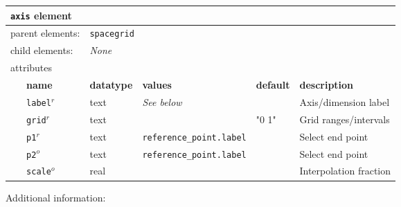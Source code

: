 \FloatBarrier
\begin{table}[h]
\begin{center}
\begin{tabularx}{\textwidth}{l l l l l l }
\hline
\multicolumn{6}{l}{\texttt{axis} element} \\
\hline
\multicolumn{2}{l}{parent elements:} & \multicolumn{4}{l}{\texttt{spacegrid}}\\
\multicolumn{2}{l}{child  elements:} & \multicolumn{4}{l}{\textit{None}}\\
\multicolumn{2}{l}{attributes}  & \multicolumn{4}{l}{}\\
   &   \bfseries name        & \bfseries datatype & \bfseries values & \bfseries default   & \bfseries description \\
   &   \texttt{label}$^r$    &  text              & \textit{See below}&                    &  Axis/dimension label \\
   &   \texttt{grid}$^r$     &  text              &                  & "0 1"             &  Grid ranges/intervals \\
   &   \texttt{p1}$^r$       &  text              & \texttt{reference\_point.label}   &    &  Select end point     \\
   &   \texttt{p2}$^o$       &  text              & \texttt{reference\_point.label}   &    &  Select end point     \\
   &   \texttt{scale}$^o$    &  real              &                  &                     &  Interpolation fraction\\
  \hline
\end{tabularx}
\end{center}
\end{table}
\FloatBarrier
Additional information:
